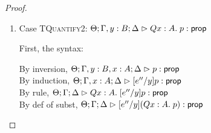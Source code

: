 \begin{proof}
\begin{enumerate}
  For semantics, consider
  $\interp{\judgeA[\Theta; \Gamma; \Delta]
                  {[e''/y](Q u:\upsilon.\;p)}{\assert}}\;\theta\;\gamma\;\delta$ 
  \begin{eqnproof}
          {Semantics}
          {Induction}
          {Semantics}
  \end{eqnproof}

\item Case \textsc{TQuantify2}: $\judgeA[\Theta; \Gamma, y:B; \Delta]{Q x:A.\;p}{\assert}$
  
  First, the syntax:
  \begin{tabbedproof}
    \oo By inversion, $\judgeA[\Theta; \Gamma, y:B, x:A; \Delta]{p}{\assert}$ \\
    \oo By induction, $\judgeA[\Theta; \Gamma, x:A; \Delta]{[e''/y]p}{\assert}$ \\
    \oo By rule, $\judgeA[\Theta; \Gamma; \Delta]
                         {Q x:A.\;[e''/y]p}{\assert}$ \\
    \oo By def of subst, $\judgeA[\Theta; \Gamma; \Delta]
                                 {[e''/y](Q x:A.\;p)}{\assert}$ 
  \end{tabbedproof}


\end{enumerate}
\end{proof}
